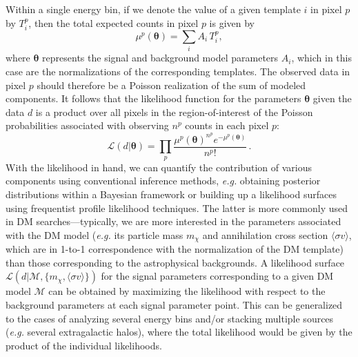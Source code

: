 Within a single energy bin, if we denote the value of a given template $i$ in pixel $p$ by $T_i^p$, then the total expected counts in pixel $p$ is given by 
\begin{equation}
\mu^p(\boldsymbol \theta) = \sum_i A_i\,T_i^p,
\end{equation}
where $\boldsymbol \theta$ represents the signal and background model parameters ${A_i}$, which in this case are the normalizations of the corresponding templates. The observed data in pixel $p$ should therefore be a Poisson realization of the sum of modeled components. It follows that the likelihood function for the parameters $\boldsymbol \theta$ given the data $d$ is a product over all pixels in the region-of-interest of the Poisson probabilities associated with observing $n^{p}$ counts in each pixel $p$:
\begin{equation}
\mathcal{L}(d | {\boldsymbol \theta}) = \prod_p \frac{\mu^{p}({\boldsymbol \theta})^{n^{p}} e^{-\mu^{p}({\boldsymbol \theta})}}{n^{p}!}\,.
\label{eq:pi}
\end{equation}
With the likelihood in hand, we can quantify the contribution of various components using conventional inference methods, \emph{e.g.} obtaining posterior distributions within a Bayesian framework or building up a likelihood surfaces using frequentist profile likelihood techniques. The latter is more commonly used in DM searches---typically, we are more interested in the parameters associated with the DM model (\emph{e.g.} its particle mass $m_\chi$ and annihilation cross section $\langle\sigma v\rangle$, which are in 1-to-1 correspondence with the normalization of the DM template) than those corresponding to the astrophysical backgrounds. A likelihood surface $\mathcal{L}(d|\mathcal M, \{m_\chi, \langle\sigma v\rangle\})$ for the signal parameters corresponding to a given DM model $\mathcal M$ can be obtained by maximizing the likelihood with respect to the background parameters at each signal parameter point. This can be generalized to the cases of analyzing several energy bins and/or stacking multiple sources (\emph{e.g.} several extragalactic halos), where the total likelihood would be given by the product of the individual likelihoods.

